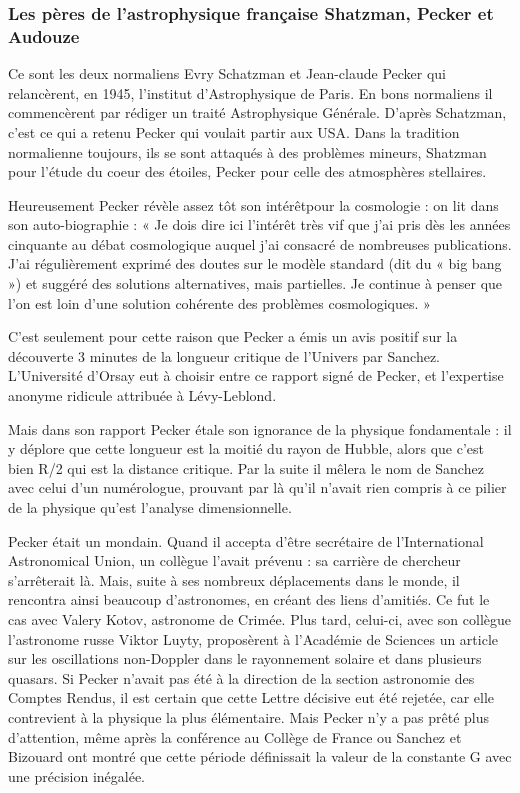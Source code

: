 \documentclass[a4paper,12pt]{article}
\begin{document}
\subsubsection{Les pères de l’astrophysique française Shatzman, Pecker et Audouze}
        Ce sont les deux normaliens Evry Schatzman et Jean-claude Pecker qui relancèrent, en 1945, l’institut d’Astrophysique de Paris. 
         En bons normaliens il commencèrent par rédiger un traité Astrophysique Générale. D’après Schatzman, c’est ce qui a retenu Pecker qui voulait partir aux USA. 
            Dans la tradition normalienne toujours, ils se sont attaqués à des problèmes mineurs, Shatzman pour l’étude du coeur des étoiles, Pecker pour celle des atmosphères stellaires.

Heureusement Pecker révèle assez tôt son intérêtpour la cosmologie : on lit dans son auto-biographie : « Je dois dire ici l'intérêt très vif que j'ai pris dès les années cinquante au débat cosmologique auquel j'ai consacré de nombreuses publications. J'ai régulièrement exprimé des doutes sur le modèle standard (dit du « big bang ») et suggéré des solutions alternatives, mais partielles. Je continue à penser que l'on est loin d'une solution cohérente des problèmes cosmologiques. »

C’est seulement pour cette raison que Pecker a émis un avis positif sur la découverte 3 minutes de la longueur critique de l’Univers par Sanchez. L’Université d’Orsay eut à choisir entre ce rapport signé de Pecker, et l’expertise anonyme ridicule attribuée à Lévy-Leblond.

Mais dans son rapport Pecker étale son ignorance de la physique fondamentale : il y déplore que cette longueur est la moitié du rayon de Hubble, alors que c’est bien R/2 qui est la distance critique. Par la suite il m\^elera le nom de Sanchez avec celui d’un numérologue, prouvant par là qu’il n’avait rien compris à ce pilier de la  physique qu’est l’analyse dimensionnelle.

Pecker était un mondain. Quand il accepta d’être secrétaire de l’International Astronomical Union, un collègue l’avait prévenu : sa carrière de chercheur s’arrêterait là. Mais, suite à ses nombreux déplacements dans le monde, il rencontra ainsi beaucoup d’astronomes, en créant des liens d’amitiés. Ce fut le cas avec Valery Kotov, astronome de Crimée. Plus tard, celui-ci, avec son collègue l’astronome russe Viktor Luyty, proposèrent à l’Académie de Sciences un article sur les oscillations non-Doppler dans le rayonnement solaire et dans plusieurs quasars. Si Pecker n’avait pas été à la direction de la section astronomie des Comptes Rendus, il est certain que cette Lettre décisive eut été rejetée, car elle contrevient à la physique la plus élémentaire. Mais Pecker n’y a pas prêté plus d’attention, même après la conférence au Collège de France ou Sanchez et Bizouard ont montré que cette période définissait la valeur de la constante G avec une précision inégalée.
\end{document}
